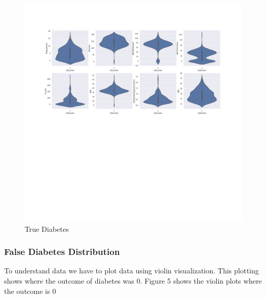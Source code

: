 \documentclass[
]{article}
\begin{document}
\begin{figure}
\centering
\includegraphics{truediab.jpg}
\caption{True Diabetes}
\end{figure}

\hypertarget{false-diabetes-distribution}{%
\subsubsection{False Diabetes
Distribution}\label{false-diabetes-distribution}}

To understand data we have to plot data using violin visualization. This
plotting shows where the outcome of diabetes was 0. Figure 5 shows the
violin plots where the outcome is 0
\end{document}
